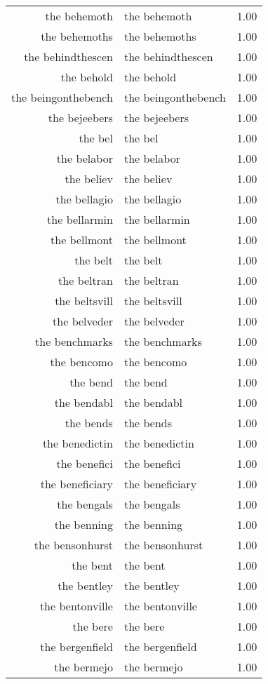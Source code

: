 \begin{table}[ht]
\begin{tabular}{rlr}
  the behemoth & the behemoth & 1.00 \\ 
  the behemoths & the behemoths & 1.00 \\ 
  the behindthescen & the behindthescen & 1.00 \\ 
  the behold & the behold & 1.00 \\ 
  the beingonthebench & the beingonthebench & 1.00 \\ 
  the bejeebers & the bejeebers & 1.00 \\ 
  the bel & the bel & 1.00 \\ 
  the belabor & the belabor & 1.00 \\ 
  the believ & the believ & 1.00 \\ 
  the bellagio & the bellagio & 1.00 \\ 
  the bellarmin & the bellarmin & 1.00 \\ 
  the bellmont & the bellmont & 1.00 \\ 
  the belt & the belt & 1.00 \\ 
  the beltran & the beltran & 1.00 \\ 
  the beltsvill & the beltsvill & 1.00 \\ 
  the belveder & the belveder & 1.00 \\ 
  the benchmarks & the benchmarks & 1.00 \\ 
  the bencomo & the bencomo & 1.00 \\ 
  the bend & the bend & 1.00 \\ 
  the bendabl & the bendabl & 1.00 \\ 
  the bends & the bends & 1.00 \\ 
  the benedictin & the benedictin & 1.00 \\ 
  the benefici & the benefici & 1.00 \\ 
  the beneficiary & the beneficiary & 1.00 \\ 
  the bengals & the bengals & 1.00 \\ 
  the benning & the benning & 1.00 \\ 
  the bensonhurst & the bensonhurst & 1.00 \\ 
  the bent & the bent & 1.00 \\ 
  the bentley & the bentley & 1.00 \\ 
  the bentonville & the bentonville & 1.00 \\ 
  the bere & the bere & 1.00 \\ 
  the bergenfield & the bergenfield & 1.00 \\ 
  the bermejo & the bermejo & 1.00 \\ 

\end{tabular}
\end{table}
